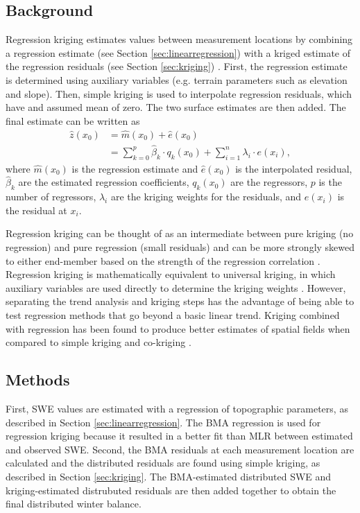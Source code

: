 \documentclass{sfuthesis}
\begin{document}
\subsection{Background}

Regression kriging estimates values between measurement locations by combining a regression estimate (see Section \ref{sec:linearregression}) with a kriged estimate of the regression residuals (see Section \ref{sec:kriging}) \citep{Hengl2007}. First, the regression estimate is determined using auxiliary variables (e.g. terrain parameters such as elevation and slope). Then, simple kriging is used to interpolate regression residuals, which have and assumed mean of zero. The two surface estimates are then added. The final estimate can be written as 
\begin{align}
\hat{z}(x_0) &= \hat{m}(x_0) + \hat{e}(x_0)\\
& = \sum^p_{k=0}\hat{\beta}_k \cdot	q_k(x_0)+ \sum_{i=1}^{n} \lambda_i \cdot e(x_i),
\end{align}
where $\hat{m}(x_0)$ is the regression estimate and $\hat{e}(x_0)$ is the interpolated residual, $\hat{\beta}_k$ are the estimated regression coefficients, $q_k(x_0)$ are the regressors, $p$ is the number of regressors, $\lambda_i$ are the kriging weights for the residuals, and $e(x_i)$ is the residual at $x_i$.

Regression kriging can be thought of as an intermediate between pure kriging (no regression) and pure regression (small residuals) and can be more strongly skewed to either end-member based on the strength of the regression correlation \citep{Hengl2007}. Regression kriging is mathematically equivalent to universal kriging, in which auxiliary variables are used directly to determine the kriging weights \citep{Hengl2007}. However, separating the trend analysis and kriging steps has the advantage of being able to test regression methods that go beyond a basic linear trend. Kriging combined with regression has been found to produce better estimates of spatial fields when compared to simple kriging and co-kriging \citep{Knotters1995}.

\subsection{Methods}

First, SWE values are estimated with a regression of topographic parameters, as described in Section \ref{sec:linearregression}. The BMA regression is used for regression kriging because it resulted in a better fit than MLR between estimated and observed SWE. Second, the BMA residuals at each measurement location are calculated and the distributed residuals are found using simple kriging, as described in Section \ref{sec:kriging}. The BMA-estimated distributed SWE and kriging-estimated distrubuted residuals are then added together to obtain the final distributed winter balance. 
\end{document}

